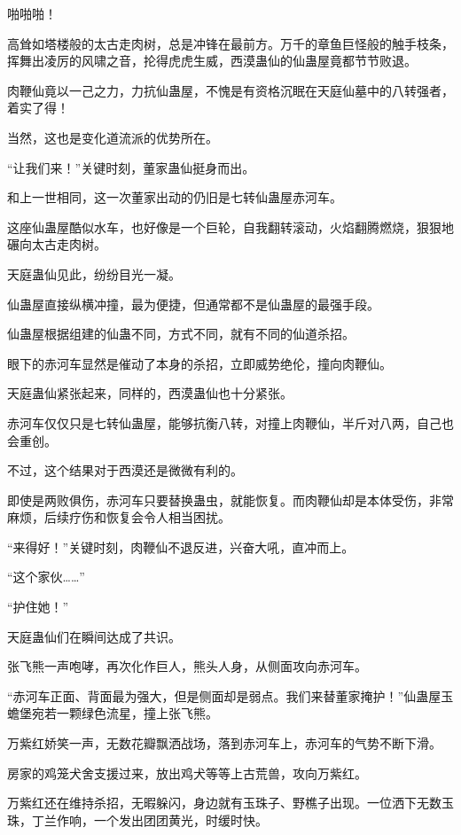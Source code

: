 
\begin{this_body}

啪啪啪！

高耸如塔楼般的太古走肉树，总是冲锋在最前方。万千的章鱼巨怪般的触手枝条，挥舞出凌厉的风啸之音，抡得虎虎生威，西漠蛊仙的仙蛊屋竟都节节败退。

肉鞭仙竟以一己之力，力抗仙蛊屋，不愧是有资格沉眠在天庭仙墓中的八转强者，着实了得！

当然，这也是变化道流派的优势所在。

“让我们来！”关键时刻，董家蛊仙挺身而出。

和上一世相同，这一次董家出动的仍旧是七转仙蛊屋赤河车。

这座仙蛊屋酷似水车，也好像是一个巨轮，自我翻转滚动，火焰翻腾燃烧，狠狠地碾向太古走肉树。

天庭蛊仙见此，纷纷目光一凝。

仙蛊屋直接纵横冲撞，最为便捷，但通常都不是仙蛊屋的最强手段。

仙蛊屋根据组建的仙蛊不同，方式不同，就有不同的仙道杀招。

眼下的赤河车显然是催动了本身的杀招，立即威势绝伦，撞向肉鞭仙。

天庭蛊仙紧张起来，同样的，西漠蛊仙也十分紧张。

赤河车仅仅只是七转仙蛊屋，能够抗衡八转，对撞上肉鞭仙，半斤对八两，自己也会重创。

不过，这个结果对于西漠还是微微有利的。

即使是两败俱伤，赤河车只要替换蛊虫，就能恢复。而肉鞭仙却是本体受伤，非常麻烦，后续疗伤和恢复会令人相当困扰。

“来得好！”关键时刻，肉鞭仙不退反进，兴奋大吼，直冲而上。

“这个家伙……”

“护住她！”

天庭蛊仙们在瞬间达成了共识。

张飞熊一声咆哮，再次化作巨人，熊头人身，从侧面攻向赤河车。

“赤河车正面、背面最为强大，但是侧面却是弱点。我们来替董家掩护！”仙蛊屋玉蟾堡宛若一颗绿色流星，撞上张飞熊。

万紫红娇笑一声，无数花瓣飘洒战场，落到赤河车上，赤河车的气势不断下滑。

房家的鸡笼犬舍支援过来，放出鸡犬等等上古荒兽，攻向万紫红。

万紫红还在维持杀招，无暇躲闪，身边就有玉珠子、野樵子出现。一位洒下无数玉珠，丁兰作响，一个发出团团黄光，时缓时快。


\end{this_body}
